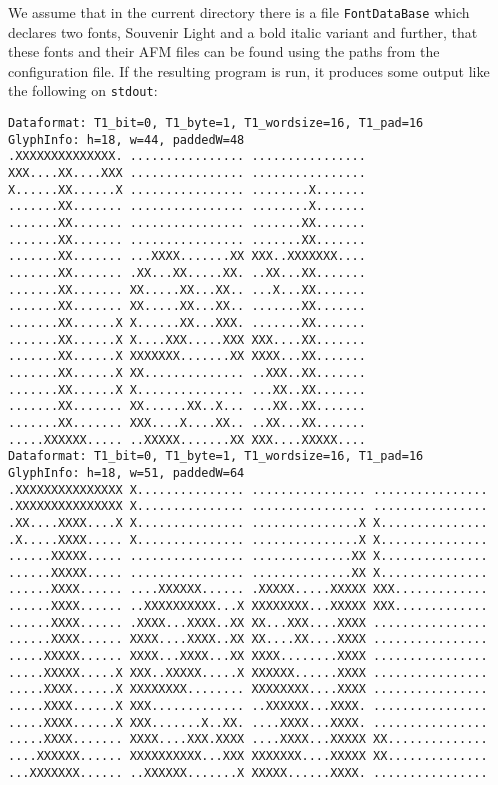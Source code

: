 We assume that in the current directory there is a file
\verb+FontDataBase+ which declares two fonts, Souvenir Light and a bold
italic variant and further, that these fonts and their
AFM files can be found using the paths from the configuration
file. 
If the resulting program is run, it produces some output like the following on 
\verb+stdout+: 
\newpage
\begin{verbatim}
Dataformat: T1_bit=0, T1_byte=1, T1_wordsize=16, T1_pad=16
GlyphInfo: h=18, w=44, paddedW=48
.XXXXXXXXXXXXXX. ................ ................ 
XXX....XX....XXX ................ ................ 
X......XX......X ................ ........X....... 
.......XX....... ................ ........X....... 
.......XX....... ................ .......XX....... 
.......XX....... ................ .......XX....... 
.......XX....... ...XXXX.......XX XXX..XXXXXXX.... 
.......XX....... .XX...XX.....XX. ..XX...XX....... 
.......XX....... XX.....XX...XX.. ...X...XX....... 
.......XX....... XX.....XX...XX.. .......XX....... 
.......XX......X X......XX...XXX. .......XX....... 
.......XX......X X....XXX.....XXX XXX....XX....... 
.......XX......X XXXXXXX.......XX XXXX...XX....... 
.......XX......X XX.............. ..XXX..XX....... 
.......XX......X X............... ...XX..XX....... 
.......XX....... XX......XX..X... ...XX..XX....... 
.......XX....... XXX....X....XX.. ..XX...XX....... 
.....XXXXXX..... ..XXXXX.......XX XXX....XXXXX.... 
Dataformat: T1_bit=0, T1_byte=1, T1_wordsize=16, T1_pad=16
GlyphInfo: h=18, w=51, paddedW=64
.XXXXXXXXXXXXXXX X............... ................ ................ 
.XXXXXXXXXXXXXXX X............... ................ ................ 
.XX....XXXX....X X............... ...............X X............... 
.X.....XXXX..... X............... ...............X X............... 
......XXXXX..... ................ ..............XX X............... 
......XXXXX..... ................ ..............XX X............... 
......XXXX...... ....XXXXXX...... .XXXXX.....XXXXX XXX............. 
......XXXX...... ..XXXXXXXXXX...X XXXXXXXX...XXXXX XXX............. 
......XXXX...... .XXXX...XXXX..XX XX...XXX....XXXX ................ 
......XXXX...... XXXX....XXXX..XX XX....XX....XXXX ................ 
.....XXXXX...... XXXX...XXXX...XX XXXX........XXXX ................ 
.....XXXXX.....X XXX..XXXXX.....X XXXXXX......XXXX ................ 
.....XXXX......X XXXXXXXX........ XXXXXXXX....XXXX ................ 
.....XXXX......X XXX............. ..XXXXXX...XXXX. ................ 
.....XXXX......X XXX.......X..XX. ....XXXX...XXXX. ................ 
.....XXXX....... XXXX....XXX.XXXX ....XXXX...XXXXX XX.............. 
....XXXXXX...... XXXXXXXXXX...XXX XXXXXXX....XXXXX XX.............. 
...XXXXXXX...... ..XXXXXX.......X XXXXX......XXXX. ................ 
\end{verbatim}


